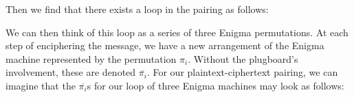 \noindent Then we find that there exists a loop in the pairing as follows:

\begin{center}
\end{center}
We can then think of this loop as a series of three Enigma
permutations. At each step of enciphering the message, we have a new
arrangement of the Enigma machine represented by the permutation
$\pi_i$. Without the plugboard's involvement, these are denoted
$\overline{\pi_i}$. For our plaintext-ciphertext pairing, we can
imagine that the $\overline{\pi_i}$s for our loop of three Enigma
machines may look as follows:

